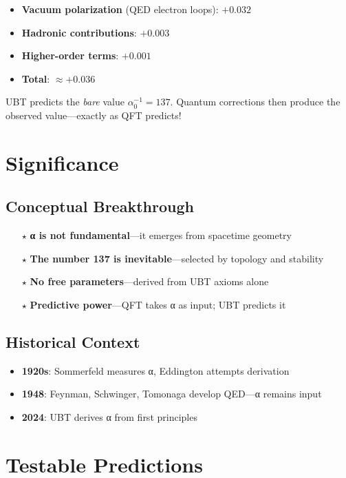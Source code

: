 \documentclass[12pt, a4paper]{article}
\begin{document}
\begin{itemize}
\item \textbf{Vacuum polarization} (QED electron loops): $+0.032$
\item \textbf{Hadronic contributions}: $+0.003$
\item \textbf{Higher-order terms}: $+0.001$
\item \textbf{Total}: $\approx +0.036$ \checkmark
\end{itemize}

UBT predicts the \emph{bare} value $\alpha_0^{-1} = 137$. Quantum corrections then produce the observed value—exactly as QFT predicts!

\section{Significance}

\subsection{Conceptual Breakthrough}

\begin{itemize}
\item[$\star$] \textbf{α is not fundamental}—it emerges from spacetime geometry
\item[$\star$] \textbf{The number 137 is inevitable}—selected by topology and stability
\item[$\star$] \textbf{No free parameters}—derived from UBT axioms alone
\item[$\star$] \textbf{Predictive power}—QFT takes α as input; UBT predicts it
\end{itemize}

\subsection{Historical Context}

\begin{itemize}
\item \textbf{1920s}: Sommerfeld measures α, Eddington attempts derivation
\item \textbf{1948}: Feynman, Schwinger, Tomonaga develop QED—α remains input
\item \textbf{2024}: UBT derives α from first principles \textcolor{resultgreen}{\checkmark}
\end{itemize}

\section{Testable Predictions}
\end{document}
